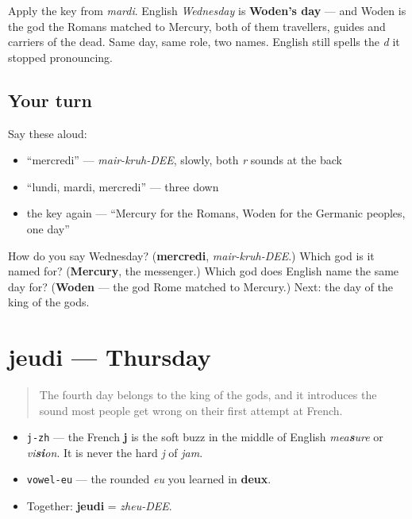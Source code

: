 \begin{culture}
Apply the key from \emph{mardi}. English \emph{Wednesday} is \textbf{Woden's day} — and Woden is the god the Romans matched to Mercury, both of them travellers, guides and carriers of the dead. Same day, same role, two names. English still spells the \emph{d} it stopped pronouncing.
\end{culture}

\subsection*{Your turn}
Say these aloud:

\begin{itemize}
\raggedright
  \item \textquotedblleft{}mercredi\textquotedblright{} — \emph{mair-kruh-DEE}, slowly, both \emph{r} sounds at the back
  \item \textquotedblleft{}lundi, mardi, mercredi\textquotedblright{} — three down
  \item the key again — \textquotedblleft{}Mercury for the Romans, Woden for the Germanic peoples, one day\textquotedblright{}
\end{itemize}

\begin{tcolorbox}[breakable,colback=teal!4,colframe=teal!35!black,title={Before you move on}]
How do you say Wednesday? (\textbf{mercredi}, \emph{mair-kruh-DEE}.) Which god is it named for? (\textbf{Mercury}, the messenger.) Which god does English name the same day for? (\textbf{Woden} — the god Rome matched to Mercury.) Next: the day of the king of the gods.
\end{tcolorbox}
\section[jeudi]{jeudi — Thursday}

\label{lesson:FR-C07-jeudi}



\begin{quote}
The fourth day belongs to the king of the gods, and it introduces the sound most people get wrong on their first attempt at French.
\end{quote}

\begin{sounds}
\begin{itemize}
\raggedright
  \item \texttt{j-zh} — the French \textbf{j} is the soft buzz in the middle of English \emph{mea\textbf{s}ure} or \emph{vi\textbf{si}on}. It is never the hard \emph{j} of \emph{jam}.
  \item \texttt{vowel-eu} — the rounded \emph{eu} you learned in \textbf{deux}.
  \item Together: \textbf{jeudi} = \emph{zheu-DEE}.
\end{itemize}
\end{sounds}

